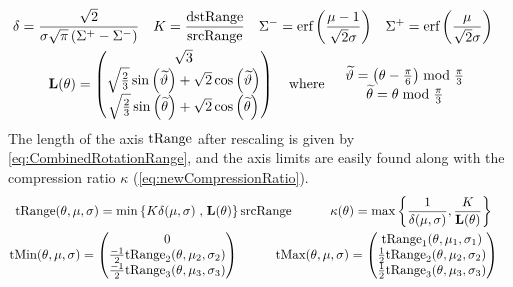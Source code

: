\begin{gather*}
 \begin{aligned}
  \delta  &= \frac{ \sqrt{2} }{ \sigma \sqrt{\pi }  \left(\Sigma^+-\Sigma^-\right)} & 
 K & =  \frac{\text{dstRange}}{\text{srcRange}}  & 
 \Sigma^- &= \text{erf}\left(\frac{\mu -1}{\sqrt{2} \sigma }\right) &
 \Sigma^+ &= \text{erf}\left(\frac{\mu }{\sqrt{2} \sigma }\right) 
  \end{aligned} \\
  \mathbf{L}(\theta) =
  \begin{pmatrix}
  \sqrt{3} \\
   \sqrt{\frac{2}{3}} \sin \left(\widetilde{\vartheta}\right) + \sqrt{2} \cos \left(\widetilde{\vartheta}\right) \\  
  \sqrt{\frac{2}{3}} \sin \left(\widetilde{\theta}\right) + \sqrt{2} \cos \left(\widetilde{\theta}\right) 
  \end{pmatrix}
  \quad \text{where}  \quad 
  \begin{array}{c}
  \widetilde{\vartheta} = \left(\theta - \frac{\pi}{6}\right) \bmod \frac{\pi }{3} \\
  \widetilde{\theta} = \theta  \bmod \frac{\pi }{3} 
  \end{array}
\end{gather*}
The length of the axis $\text{tRange}$ after rescaling is given by \ref{eq:CombinedRotationRange}, and the axis limits are easily found along with 
the compression ratio $\kappa$ (\ref{eq:newCompressionRatio}).
\begin{gather*}
\begin{aligned}
 \text{tRange}(\theta,\mu,\sigma)   & =  \min\left\{K \delta(\mu,\sigma) \right. ,  \left. \mathbf{L}(\theta) \right\}  \text{srcRange} \quad&\quad
 \kappa(\theta) & = \max\left\{ \frac{1}{\delta(\mu,\sigma) }   , \frac{K}{\mathbf{L}(\theta)} \right\}  
 \end{aligned} \\
 \begin{aligned}
  \text{tMin}(\theta,\mu,\sigma)   & =
 \begin{pmatrix}
 0 \\
  \frac{-1 }{2} \text{tRange}_2(\theta,\mu_2,\sigma_2) \\  
  \frac{-1 }{2} \text{tRange}_3(\theta,\mu_3,\sigma_3) \\  
 \end{pmatrix} \quad & \quad
  \text{tMax}(\theta,\mu,\sigma)   & =
 \begin{pmatrix}
  \text{tRange}_1(\theta,\mu_1,\sigma_1)  \\
  \frac{1 }{2} \text{tRange}_2(\theta,\mu_2,\sigma_2)  \\  
  \frac{1 }{2} \text{tRange}_3(\theta,\mu_3,\sigma_3)  \\  
 \end{pmatrix} 
 \end{aligned}
\end{gather*}



